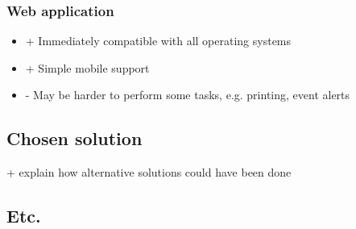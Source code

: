 \subsubsection{Web application}

\begin{itemize}
  \item + Immediately compatible with all operating systems
  \item + Simple mobile support
  \item - May be harder to perform some tasks, e.g. printing, event alerts
\end{itemize}


\subsection{Chosen solution}

+ explain how alternative solutions could have been done

\subsection{Etc.}
